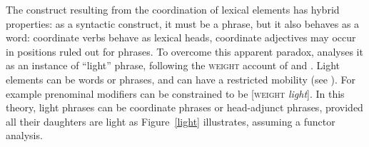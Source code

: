 \documentclass[output=paper
                ,modfonts
                ,nonflat
	        ,collection
	        ,collectionchapter
	        ,collectiontoclongg
 	        ,biblatex
                ,babelshorthands
                ,newtxmath
                ,draftmode
                ,colorlinks, citecolor=brown
]{./langsci/langscibook}
\begin{document}
{%
{}


                                                    
The construct resulting from the coordination of lexical elements has hybrid properties: as a syntactic construct, it must be a phrase, but it also behaves as a word: coordinate verbs behave as lexical heads, coordinate adjectives may occur in positions ruled out for phrases. To overcome this apparent paradox, \citet[Section~5.1]{Abeille:06} analyses it as an instance of ``light'' phrase, following the \textsc{weight} account of \citet{Abeille:Godard:2000} and \citet{Abeille:Godard:2004}. Light elements can be words or phrases, and can have a restricted mobility (see ). For example prenominal modifiers can be constrained to be [\textsc{weight} \emph{light}]. In this theory, light phrases can be coordinate phrases or head-adjunct phrases, provided all their daughters are light as Figure~\ref{light} illustrates, assuming a functor analysis.


}
\end{document}
